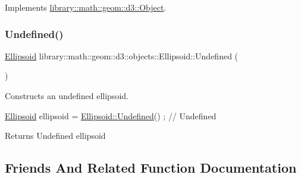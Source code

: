 Implements \hyperlink{classlibrary_1_1math_1_1geom_1_1d3_1_1_object_a989723a27a7d5f6739e45ea695a6c7ed}{library\+::math\+::geom\+::d3\+::\+Object}.

\mbox{\label{classlibrary_1_1math_1_1geom_1_1d3_1_1objects_1_1_ellipsoid_affcef36f736e6d21a0246a149b8fb688}} 
\subsubsection{\texorpdfstring{Undefined()}{Undefined()}}
{\footnotesize\ttfamily \hyperlink{classlibrary_1_1math_1_1geom_1_1d3_1_1objects_1_1_ellipsoid}{Ellipsoid} library\+::math\+::geom\+::d3\+::objects\+::\+Ellipsoid\+::\+Undefined (\begin{DoxyParamCaption}{ }\end{DoxyParamCaption})\hspace{0.3cm}{\ttfamily [static]}}



Constructs an undefined ellipsoid. 


\begin{DoxyCode}
\hyperlink{classlibrary_1_1math_1_1geom_1_1d3_1_1objects_1_1_ellipsoid_aae81fe0edc7f0e8d4590ea89ae73cb14}{Ellipsoid} ellipsoid = \hyperlink{classlibrary_1_1math_1_1geom_1_1d3_1_1objects_1_1_ellipsoid_affcef36f736e6d21a0246a149b8fb688}{Ellipsoid::Undefined}() ; \textcolor{comment}{// Undefined}
\end{DoxyCode}


\begin{DoxyReturn}{Returns}
Undefined ellipsoid 
\end{DoxyReturn}


\subsection{Friends And Related Function Documentation}
\mbox{\label{classlibrary_1_1math_1_1geom_1_1d3_1_1objects_1_1_ellipsoid_a95f4f6dc4d64843c673c7ac965468a2c}} 
